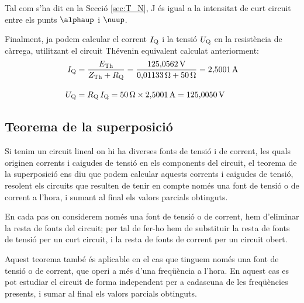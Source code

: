 \begin{exemple}
Tal com s'ha dit en la Secci\'{o} \ref{sec:T_N}, J \'{e}s igual a la
intensitat de curt circuit entre els punts $\alphaup$ i $\nuup$.

Finalment, ja podem calcular el corrent $I_\mathrm{Q}$ i la tensi\'{o} $U_\mathrm{Q}$ en la
resist\`{e}ncia de c\`{a}rrega, utilitzant el circuit Th\'{e}venin equivalent calculat anteriorment:
\begin{align*}
    I_\mathrm{Q} &= \frac{E_\mathrm{Th}}{Z_\mathrm{Th} + R_\mathrm{Q}} = \frac{125{,}0562\mathrm{\,V}}
    {0{,}01133\mathrm{\,\mathrm{\Omega}} + 50\mathrm{\,\mathrm{\Omega}}} = 2{,}5001\mathrm{\,A} \\[2ex]
    U_\mathrm{Q} &=  R_\mathrm{Q} \,I_\mathrm{Q} = 50\mathrm{\,\mathrm{\Omega}} \times 2{,}5001\mathrm{\,A} =
    125{,}0050\mathrm{\,V}
\end{align*}
\end{exemple}


\subsection{Teorema de la superposici\'{o}}

Si tenim un circuit lineal on hi ha diverses fonts de tensi\'{o} i  de
corrent, les quals originen corrents i caigudes de tensi\'{o} en els
components del circuit, el teorema de la superposici\'{o} ens diu que
podem calcular aquests corrents i caigudes de tensi\'{o}, resolent els
circuits que resulten de tenir en compte  nom\'{e}s una font de tensi\'{o} o
de corrent a l'hora, i sumant al final els valors parcials
obtinguts.

En cada pas on considerem nom\'{e}s una font de tensi\'{o} o de corrent, hem
d'eliminar la resta de fonts del circuit; per tal de fer-ho hem de
substituir la resta de fonts de tensi\'{o} per un curt circuit, i la
resta de fonts de corrent per un circuit obert.

Aquest teorema tamb\'{e} \'{e}s aplicable en el cas que tinguem nom\'{e}s una
font de tensi\'{o} o de corrent, que operi a m\'{e}s d'una freq\"{u}\`{e}ncia a
l'hora. En aquest cas es pot estudiar el circuit de forma
independent per a cadascuna de les freq\"{u}\`{e}ncies presents, i sumar al
final els valors parcials obtinguts.

